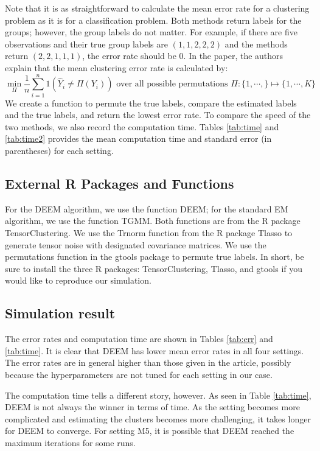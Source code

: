 \documentclass[11pt]{article}
\begin{document}
Note that it is as straightforward to calculate the mean error rate for a clustering problem as it is for a classification problem. Both methods return labels for the groups; however, the group labels do not matter. For example, if there are five observations and their true group labels are $(1,1,2,2,2)$ and the methods return $(2,2,1,1,1)$, the error rate should be $0$. In the paper, the authors explain that the mean clustering error rate is calculated by: 
\[ \min_\Pi \frac{1}{n} \sum_{i=1}^n 1 (\hat{Y}_i \ne \Pi (Y_i)) \text{ over all possible permutations } \Pi: \{1, \cdots,  \} \mapsto \{1, \cdots, K\} \]
We create a function to permute the true labels, compare the estimated labels and the true labels, and return the lowest error rate. To compare the speed of the two methods, we also record the computation time. Tables \ref{tab:time} and \ref{tab:time2} provides the mean computation time and standard error (in parentheses) for each setting. 

\subsection{External R Packages and Functions}

For the DEEM algorithm, we use the function DEEM; for the standard EM algorithm, we use the function TGMM. Both functions are from the R package TensorClustering. We use the Trnorm function from the R package Tlasso to generate tensor noise with designated covariance matrices. We use the permutations function in the gtools package to permute true labels. In short, be sure to install the three R packages: TensorClustering, Tlasso, and gtools if you would like to reproduce our simulation. 


\subsection{Simulation result}

The error rates and computation time are shown in Tables \ref{tab:err} and \ref{tab:time}. It is clear that DEEM has lower mean error rates in all four settings. The error rates are in general higher than those given in the article, possibly because the hyperparameters are not tuned for each setting in our case.

The computation time tells a different story, however. As seen in Table \ref{tab:time}, DEEM is not always the winner in terms of time. As the setting becomes more complicated and estimating the clusters becomes more challenging, it takes longer for DEEM to converge. For setting M5, it is possible that DEEM reached the maximum iterations for some runs. 
\end{document}
